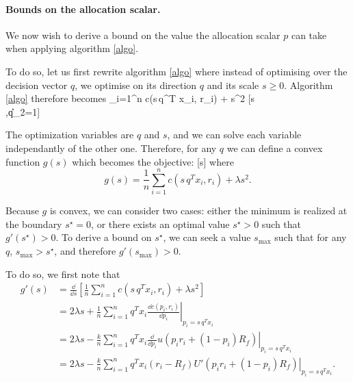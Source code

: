 
\paragraph{Bounds on the allocation scalar.}
We now wish to derive a bound on the value the allocation scalar $p$ can take when
applying algorithm \eqref{algo}.

To do so, let us first rewrite algorithm \eqref{algo} where instead of optimising over the
decision vector $q$, we optimise on its direction $q$ and its scale $s\geq0$. Algorithm
\eqref{algo} therefore becomes \minimizeEquation%
{\sum_{i=1}^n c(s\,q^T x_i, r_i) + \lambda s^2}%
[s\\,\|q\|_2=1]

The optimization variables are $q$ and $s$, and we can solve each variable independantly
of the other one. Therefore, for any $q$ we can define a convex function $g(s)$ which
becomes the objective: [s] where
\begin{equation*}
  g(s) = \frac{1}{n} \sum_{i=1}^n c(s\,q^T x_i, r_i) + \lambda s^2.
\end{equation*}

Because $g$ is convex, we can consider two cases: either the minimum is realized at the
boundary $s^\star=0$, or there exists an optimal value $s^\star > 0$ such that
$g'(s^\star) > 0$. To derive a bound on $s^\star$, we can seek a value $s_{\max}$ such
that for any $q$, $s_{\max} > s^\star$, and therefore $g'(s_{\max}) > 0$.

To do so, we first note that
\begin{align*}
    g'(s) &= \frac{\dd}{\dd s}\left[\frac{1}{n} \sum_{i=1}^n c(s\, q^{T}x_i, r_i) + \lambda s^2\right]\\
          &= 2\lambda s + \frac{1}{n} \sum_{i=1}^n q^{T}x_i \left. \frac{\dd c(p_i,r_i)}{\dd p_i} \right|_{p_i =
            s\,q^{T}x_i} \\
          &= 2\lambda s - \frac{k}{n} \sum_{i=1}^n q^{T}x_i \left. \frac{\dd}{\dd p_i} u(p_i r_i +
            (1-p_i)R_f) \right|_{p_i = s\,q^{T}x_i}\\
          &= 2\lambda s - \frac{k}{n} \sum_{i=1}^n q^{T}x_i (r_i-R_f) \left. U'(p_i r_i +
            (1-p_i)R_f) \right|_{p_i = s\,q^{T}x_i}.
\end{align*}

